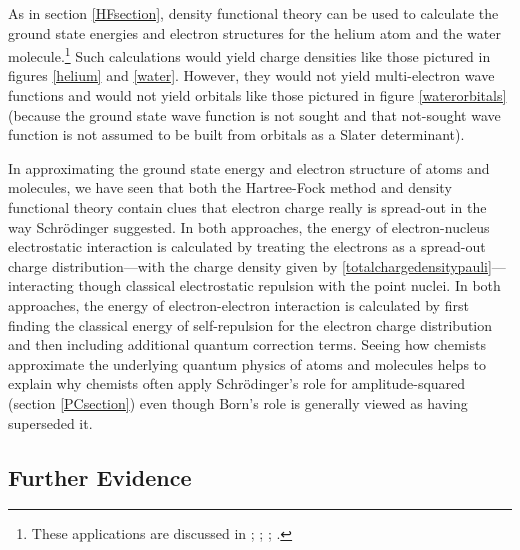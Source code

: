 \documentclass[12pt,onecolumn,secnumarabic,amsmath,amssymb,balancelastpage,nofootinbib]{article}
\begin{document}
As in section \ref{HFsection}, density functional theory can be used to calculate the ground state energies and electron structures for the helium atom and the water molecule.\footnote{These applications are discussed in \cite{kim1994}; \cite[sec.\ 8.9]{martin2004}; \cite{baseden2014}; \cite[pg.\ 571]{levineQC}.}  Such calculations would yield charge densities like those pictured in figures \ref{helium} and \ref{water}.  However, they would not yield multi-electron wave functions and would not yield orbitals like those pictured in figure \ref{waterorbitals} (because the ground state wave function is not sought and that not-sought wave function is not assumed to be built from orbitals as a Slater determinant).

In approximating the ground state energy and electron structure of atoms and molecules, we have seen that both the Hartree-Fock method and density functional theory contain clues that electron charge really is spread-out in the way Schr\"{o}dinger suggested.  In both approaches, the energy of electron-nucleus electrostatic interaction is calculated by treating the electrons as a spread-out charge distribution---with the charge density given by \eqref{totalchargedensitypauli}---interacting though classical electrostatic repulsion with the point nuclei.  In both approaches, the energy of electron-electron interaction is calculated by first finding the classical energy of self-repulsion for the electron charge distribution and then including additional quantum correction terms.  Seeing how chemists approximate the underlying quantum physics of atoms and molecules helps to explain why chemists often apply Schr\"{o}dinger's role for amplitude-squared (section \ref{PCsection}) even though Born's role is generally viewed as having superseded it.

\subsection{Further Evidence}\label{FEsection}
\end{document}
